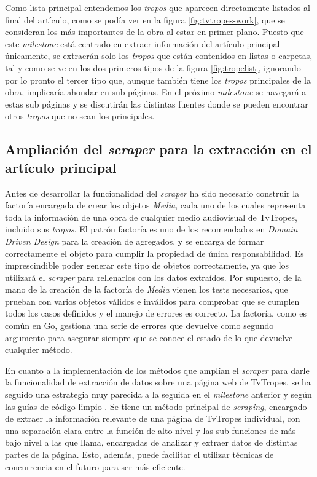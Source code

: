 Como lista principal entendemos los \textit{tropos} que aparecen directamente
listados al final del artículo, como se podía ver en la
figura \ref{fig:tvtropes-work}, que se consideran los más importantes de la obra al
estar en primer plano. Puesto que este \textit{milestone} está centrado en
extraer información del artículo principal únicamente, se extraerán solo los
\textit{tropos} que están contenidos en listas o carpetas, tal y como se ve en
los dos primeros tipos de la figura \ref{fig:tropelist}, ignorando por lo pronto el
tercer tipo que, aunque también tiene los \textit{tropos} principales de la
obra, implicaría ahondar en sub páginas. En el próximo \textit{milestone} se
navegará a estas sub páginas y se discutirán las distintas fuentes donde se
pueden encontrar otros \textit{tropos} que no sean los principales.

\subsection{Ampliación del \textit{scraper} para la extracción en el artículo
principal} 

Antes de desarrollar la funcionalidad del \textit{scraper} ha sido necesario
construir la factoría encargada de crear los objetos \textit{Media}, cada uno de
los cuales representa toda la información de una obra de cualquier medio
audiovisual de TvTropes, incluido sus \textit{tropos}. El patrón factoría es uno
de los recomendados en \textit{Domain Driven Design} para la creación de
agregados, y se encarga de formar correctamente el objeto para cumplir la
propiedad de única responsabilidad. Es imprescindible poder generar este tipo de
objetos correctamente, ya que los utilizará el \textit{scraper} para rellenarlos
con los datos extraídos. Por supuesto, de la mano de la creación de la factoría
de \textit{Media} vienen los tests necesarios, que prueban con varios
objetos válidos e inválidos para comprobar que se cumplen todos los casos
definidos y el manejo de errores es correcto. La factoría, como es común en Go,
gestiona una serie de errores que devuelve como segundo argumento para asegurar
siempre que se conoce el estado de lo que devuelve cualquier método.

En cuanto a la implementación de los métodos que amplían el \textit{scraper}
para darle la funcionalidad de extracción de datos sobre una página web de
TvTropes, se ha seguido una estrategia muy parecida a la seguida en el
\textit{milestone} anterior y según las guías de código limpio
\cite{clean_code_rules}. Se tiene un método principal de \textit{scraping},
encargado de extraer la información relevante de una página de TvTropes
individual, con una separación clara entre la función de alto nivel y las sub
funciones de más bajo nivel a las que llama, encargadas de analizar y extraer
datos de distintas partes de la página. Esto, además, puede facilitar el
utilizar técnicas de concurrencia en el futuro para ser más eficiente.

